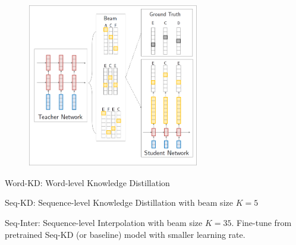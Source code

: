 \documentclass{beamer}
\let\tempone\itemize
\let\temptwo\enditemize
\renewenvironment{itemize}{\tempone\addtolength{\itemsep}{0.5\baselineskip}}{\temptwo}
\newcommand{\air}{\vspace{0.25cm}}
\begin{document}
\begin{frame}
\centerline{}
\air \air
\begin{figure}
\center
\includegraphics[width=7.5cm]{seq-inter-1}
\end{figure}
\end{frame}


\begin{frame}
\centerline{}
\begin{itemize}
\item Word-KD: Word-level Knowledge Distillation
\item Seq-KD: Sequence-level Knowledge Distillation with beam size $K=5$
\item Seq-Inter: Sequence-level Interpolation with beam size $K=35$. Fine-tune
from pretrained Seq-KD (or baseline) model with smaller learning rate.
\end{itemize}
\end{frame}
\end{document}

